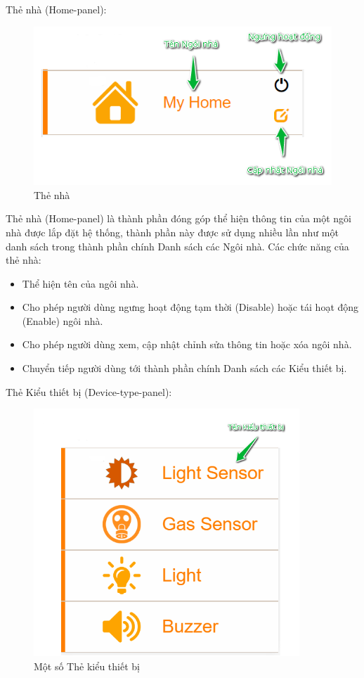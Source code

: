\documentclass[11pt,a4paper,oneside]{book}
\begin{document}
Thẻ nhà (Home-panel):

\begin{figure}[h]
  \centering
     \includegraphics[width=12cm]{6-home-panel}
  \caption{Thẻ nhà}\label{fig:6-home-panel}
\end{figure}

Thẻ nhà (Home-panel) là thành phần đóng góp thể hiện thông tin của một ngôi nhà được lắp đặt hệ thống, thành phần này được sử dụng nhiều lần như một danh sách trong thành phần chính Danh sách các Ngôi nhà. Các chức năng của thẻ nhà:

\begin{itemize}[topsep=1mm,itemsep=-0.5mm]
\item Thể hiện tên của ngôi nhà.
\item Cho phép người dùng ngưng hoạt động tạm thời (Disable) hoặc tái hoạt động (Enable) ngôi nhà.
\item Cho phép người dùng xem, cập nhật chỉnh sửa thông tin hoặc xóa ngôi nhà.
\item Chuyển tiếp người dùng tới thành phần chính Danh sách các Kiểu thiết bị.
\vspace{1mm}
\end{itemize}

Thẻ Kiểu thiết bị (Device-type-panel):

\begin{figure}[h]
  \centering
     \includegraphics[width=10cm]{6-device-type-panels}
  \caption{Một số Thẻ kiểu thiết bị}\label{fig:6-device-type-panels}
\end{figure}
\end{document}
